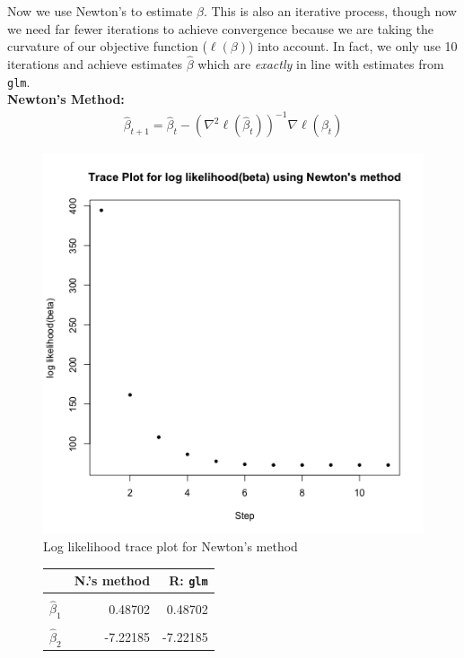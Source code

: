 \documentclass{article}
\begin{document}
\begin{enumerate}[label=(\Alph*)]
Now we use Newton's to estimate $\beta$. This is also an iterative process, though now we need far fewer iterations to achieve convergence because we are taking the curvature of our objective function ($\ell(\beta)$) into account. In fact, we only use 10 iterations and achieve estimates $\hat{\beta}$ which are \emph{exactly} in line with estimates from \texttt{glm}. \\
\textbf{Newton's Method:} 
\begin{align}
	\hat{\beta}_{t+1} = \hat{\beta}_t - (\nabla^2\ell(\hat{\beta}_t))^{-1}\nabla\ell(\hat{\beta_t})
\end{align}
		\begin{figure}[htp!]
		\centering
			\includegraphics[scale=0.5]{beta_newton.png}
			\caption{Log likelihood trace plot for Newton's method}
		\end{figure}
\begin{figure}[htp!]
		\centering
		\label{my-label2}
		\begin{tabular}{l|r|r}
		                        & N.'s method & R: \texttt{glm} \\ \hline
								\\[-1em]
		$\hat{\beta}_1$      & 0.48702           & 0.48702         \\  \hline
		\\[-1em]
		$\hat{\beta}_2$      & -7.22185          & -7.22185         \\ \hline

\end{tabular}
\end{figure}
\end{enumerate}
\end{document}
